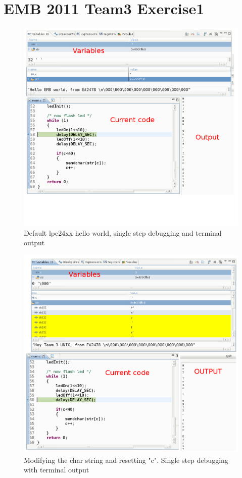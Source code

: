 

\part*{EMB 2011 Team3 Exercise1}
\begin{figure}[h!]		%
 \begin{centering}
  \includegraphics[width=1\textwidth]{screen_1.png}
   \caption{Default lpc24xx hello world, single step debugging and terminal output}
 \end{centering}
\end{figure}

\begin{figure}[h!]		%
 \begin{centering}
  \includegraphics[width=1\textwidth]{screen_2.png}
   \caption{Modifying the char string and resetting "c". Single step debugging with terminal output}
 \end{centering}
\end{figure}


